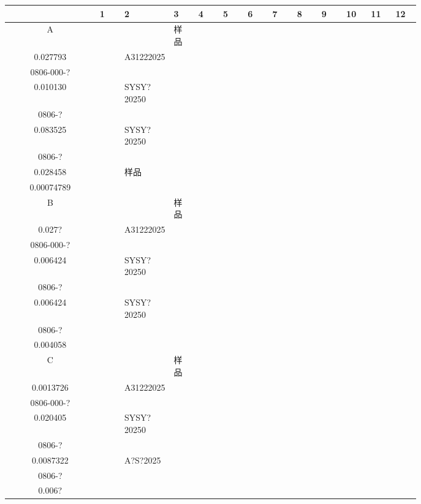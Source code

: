 \documentclass[UTF8,10pt,a4paper,fontset=fandol]{ctexart}
\begin{document}
\begin{center}
\scriptsize
\begin{tabular}{c|p{0.065\linewidth}|p{0.065\linewidth}|p{0.065\linewidth}|p{0.065\linewidth}|p{0.065\linewidth}|p{0.065\linewidth}|p{0.065\linewidth}|p{0.065\linewidth}|p{0.065\linewidth}|p{0.065\linewidth}|p{0.065\linewidth}|p{0.065\linewidth}}
 & 1 & 2 & 3 & 4 & 5 & 6 & 7 & 8 & 9 & 10 & 11 & 12\\ \hline
A & & &
\centering\scriptsize 样品\\[-1mm]\centering\scriptsize 0.027793
& &
\centering\scriptsize A31222025\\[-1mm]\centering\scriptsize 0806-000-?\\[-1mm]\centering\scriptsize 0.010130
& &
\centering\scriptsize SYSY?20250\\[-1mm]\centering\scriptsize 0806-?\\[-1mm]\centering\scriptsize 0.083525
& &
\centering\scriptsize SYSY?20250\\[-1mm]\centering\scriptsize 0806-?\\[-1mm]\centering\scriptsize 0.028458
& &
\centering\scriptsize 样品\\[-1mm]\centering\scriptsize 0.00074789
& \\ \hline
B & & &
\centering\scriptsize 样品\\[-1mm]\centering\scriptsize 0.027? 
& &
\centering\scriptsize A31222025\\[-1mm]\centering\scriptsize 0806-000-?\\[-1mm]\centering\scriptsize 0.006424
& &
\centering\scriptsize SYSY?20250\\[-1mm]\centering\scriptsize 0806-?\\[-1mm]\centering\scriptsize 0.006424
& &
\centering\scriptsize SYSY?20250\\[-1mm]\centering\scriptsize 0806-?\\[-1mm]\centering\scriptsize 0.004058
& & \\ \hline
C & & &
\centering\scriptsize 样品\\[-1mm]\centering\scriptsize 0.0013726
& &
\centering\scriptsize A31222025\\[-1mm]\centering\scriptsize 0806-000-?\\[-1mm]\centering\scriptsize 0.020405
& &
\centering\scriptsize SYSY?20250\\[-1mm]\centering\scriptsize 0806-?\\[-1mm]\centering\scriptsize 0.0087322
& &
\centering\scriptsize A?S?2025\\[-1mm]\centering\scriptsize 0806-?\\[-1mm]\centering\scriptsize 0.006? 

\end{tabular}
\end{center}
\end{document}
